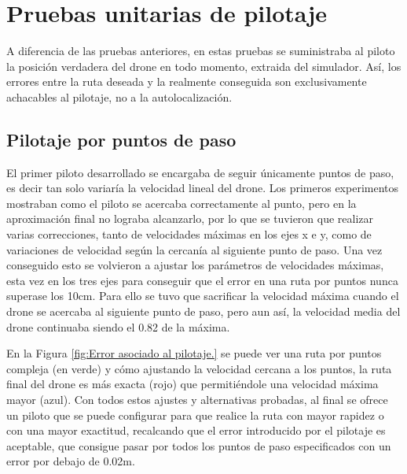 \section{Pruebas unitarias de pilotaje}
\hspace{1cm} A diferencia de las pruebas anteriores, en estas pruebas se suministraba al piloto la posición verdadera del drone en todo momento, extraida del simulador. Así, los errores entre la ruta deseada y la realmente conseguida son exclusivamente achacables al pilotaje, no a la autolocalización. 

\subsection{Pilotaje por puntos de paso}
\hspace{1cm} El primer piloto desarrollado se encargaba de seguir únicamente puntos de paso, es decir tan solo variaría la velocidad lineal del drone. Los primeros experimentos mostraban como el piloto se acercaba correctamente al punto, pero en la aproximación final no lograba alcanzarlo, por lo que se tuvieron que realizar varias correcciones, tanto de velocidades máximas en los ejes x e y, como de variaciones de velocidad según la cercanía al siguiente punto de paso. Una vez conseguido esto se volvieron a ajustar los parámetros de velocidades máximas, esta vez en los tres ejes para conseguir que el error en una ruta por puntos nunca superase los 10cm. Para ello se tuvo que sacrificar la velocidad máxima cuando el drone se acercaba al siguiente punto de paso, pero aun así, la velocidad media del drone continuaba siendo el 0.82 de la máxima.

\hspace{1cm} En la Figura \ref{fig:Error asociado al pilotaje.} se puede ver una ruta por puntos compleja (en verde) y cómo ajustando la velocidad cercana a los puntos, la ruta final del drone es más exacta (rojo) que permitiéndole una velocidad máxima mayor (azul). Con todos estos ajustes y alternativas probadas, al final se ofrece un piloto que se puede configurar para que realice la ruta con mayor rapidez o con una mayor exactitud, recalcando que el error introducido por el pilotaje es aceptable, que consigue pasar por todos los puntos de paso especificados con un error por debajo de 0.02m.

